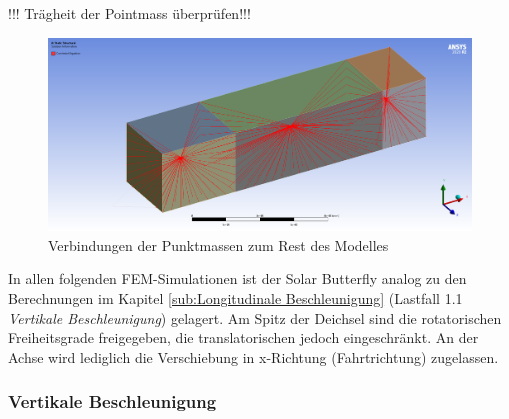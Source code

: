 !!! Trägheit der Pointmass überprüfen!!!

\begin{figure}[h]
  \centering
  \includegraphics[width=0.7\linewidth]{04_Figures/FEM Punktmasse.png}
  \caption{Verbindungen der Punktmassen zum Rest des Modelles}
  \label{img:FEM Punktmasse}
\end{figure}

In allen folgenden FEM-Simulationen ist der Solar Butterfly analog zu den Berechnungen im Kapitel \ref{sub:Longitudinale Beschleunigung} (Lastfall 1.1 \emph{Vertikale Beschleunigung}) gelagert. Am Spitz der Deichsel sind die rotatorischen Freiheitsgrade freigegeben, die translatorischen jedoch eingeschränkt. An der Achse wird lediglich die Verschiebung in x-Richtung (Fahrtrichtung) zugelassen.


\subsubsection*{Vertikale Beschleunigung}

